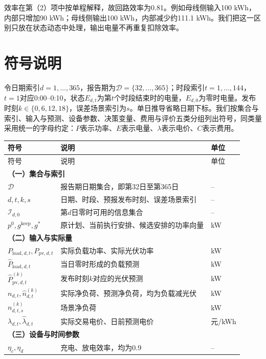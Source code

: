 \documentclass[UTF8,fontset=none,a4paper,zihao=-4]{ctexart}
\begin{document}
效率在第（2）项中按单程解释，故回路效率为0.81。例如母线侧输入100 kWh，内部只增加90 kWh；母线侧输出100 kWh，内部减少约111.1 kWh。我们把这一区别只放在状态动态中处理，输出电量不再重复扣除效率。

\section{符号说明}
令日期索引\(d=1,\ldots,365\)，报告期为\(\mathcal D=\{32,\ldots,365\}\)；时段索引\(t=1,\ldots,144\)，\(t=1\)对应0:00--0:10，状态\(E_{d,t}\)为第\(t\)个时段结束时的电量，\(E_{d,0}\)为零时电量。发布时刻\(k\in\{0,6,12,18\}\)，误差场景索引为\(s\)。单日推导省略日期下标。我们按集合与索引、输入与预测、设备参数、决策变量、费用与评价五类分组列出符号，同类量采用统一的字母约定：\(P\)表示功率、\(E\)表示电量、\(\lambda\)表示电价、\(C\)表示费用。
\begin{center}\small
\begin{longtable}{p{3.7cm}p{8.0cm}p{2.0cm}}
\toprule 符号 & 说明 & 单位\\\midrule\endfirsthead
\toprule 符号 & 说明 & 单位\\\midrule\endhead
\multicolumn{3}{l}{\textbf{（一）集合与索引}}\\
\(\mathcal D\) & 报告期日期集合，即第32日至第365日 & --\\
\(d,t,k,s\) & 日期、时段、预报发布时刻、误差场景索引 & --\\
\(\mathcal I_{d,0}\) & 第\(d\)日零时可用的信息集合 & --\\
\(p^0,g^{\mathrm{keep}},g^*\) & 原计划、当前执行安排、候选安排的功率向量 & kW\\
\midrule
\multicolumn{3}{l}{\textbf{（二）输入与实际量}}\\
\(P_{\mathrm{load},d,t},P_{\mathrm{pv},d,t}\) & 实际负载功率、实际光伏功率 & kW\\
\(\widehat P_{\mathrm{load},d,t}\) & 当日零时形成的负载预测 & kW\\
\(\widehat P_{\mathrm{pv},d,t}^{(k)}\) & 发布时刻\(k\)对应的光伏预测 & kW\\
\(n_{d,t},\widehat n_{d,t}^{(k)}\) & 实际净负荷、预测净负荷，均为负载减光伏 & kW\\
\(n_{d,t,s}^{(k)}\) & 场景净负荷 & kW\\
\(\lambda_{d,t},\widehat\lambda_{d,t}\) & 实际交易电价、日前预测电价 & 元/kWh\\
\midrule
\multicolumn{3}{l}{\textbf{（三）设备与时间参数}}\\
\(\eta_c,\eta_d\) & 充电、放电效率，均为0.9 & --\\

\end{longtable}
\end{center}
\end{document}
